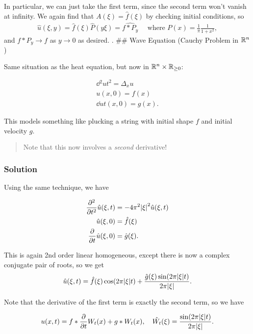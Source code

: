 In particular, we can just take the first term, since the second term
won't vanish at infinity. We again find that \(A(\xi) = \hat{f}(\xi)\)
by checking initial conditions, so
\begin{align*}
\hat{u}(\xi, y) = \hat{f}(\xi) \hat{P}(y\xi) = \widehat{f \ast P_y}
\quad \text{ where } P(x) = \frac{1}{\pi} \frac{1}{1+x^2}
,\end{align*} and \(f\ast P_y \to f\) as \(y\to 0\) as desired. . \#\#
Wave Equation (Cauchy Problem in \({\mathbb{R}}^n\))

Same situation as the heat equation, but now in
\({\mathbb{R}}^n \times {\mathbb{R}}_{\geq 0}\):

\begin{align*}
\dd{^2 u}{t^2} = \Delta_x u \\
u(x, 0) = f(x) \\
\dd{u}{t}(x, 0) = g(x)
.\end{align*}

This models something like plucking a string with initial shape \(f\)
and initial velocity \(g\).

\begin{quote}
Note that this now involves a \emph{second} derivative!
\end{quote}

\hypertarget{solution-2}{%
\subsubsection{Solution}\label{solution-2}}

Using the same technique, we have

\begin{align*}
{\frac{\partial ^2}{\partial t^2}} \hat{u}(\xi, t) &= -4\pi^2 {\left\lvert {\xi} \right\rvert}^2 \hat{u} (\xi, t) \\
\hat{u}(\xi, 0) &= \hat{f}(\xi) \\
{\frac{\partial }{\partial t}} \hat{u}(\xi, 0) &= \hat{g}(\xi)
.\end{align*}

This is again 2nd order linear homogeneous, except there is now a
complex conjugate pair of roots, so we get
\begin{align*}
\hat{u}(\xi, t) = \hat{f}(\xi) \cos(2\pi {\left\lvert {\xi} \right\rvert} t) + \frac{\hat{g}(\xi) \sin(2\pi {\left\lvert {\xi} \right\rvert} t)}{2\pi {\left\lvert {\xi} \right\rvert}}.
\end{align*}

Note that the derivative of the first term is exactly the second term,
so we have

\begin{align*}
u(x, t) = f\ast {\frac{\partial }{\partial t}} W_t(x) + g\ast W_t(x), \quad \hat{W_t}(\xi) = \frac{\sin(2\pi {\left\lvert {\xi} \right\rvert} t)}{2\pi {\left\lvert {\xi} \right\rvert}}.
\end{align*}

